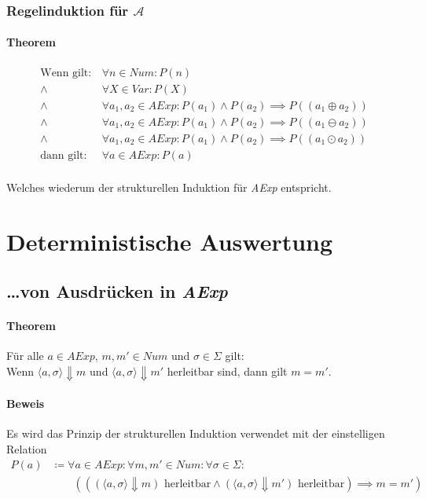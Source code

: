 \documentclass[a4paper, 11pt, accentcolor = tud3b]{tudreport}
\begin{document}
				    \subsubsection{Regelinduktion für $ \mathcal{A} $}
					    \paragraph{Theorem}
						    \begin{align*}
							    \text{Wenn gilt:} & \,\forall n \in \textit{Num} : P(n) \\
							    \land & \,\forall X \in \textit{Var} : P(X) \\
							    \land & \,\forall a _ 1, a _ 2 \in \textit{AExp} : P(a _ 1) \land P(a _ 2) \implies P((a _ 1 \oplus a _ 2)) \\
							    \land & \,\forall a _ 1, a _ 2 \in \textit{AExp} : P(a _ 1) \land P(a _ 2) \implies P((a _ 1 \ominus a _ 2)) \\
							    \land & \,\forall a _ 1, a _ 2 \in \textit{AExp} : P(a _ 1) \land P(a _ 2) \implies P((a _ 1 \odot a _ 2)) \\
							    \text{dann gilt:} & \,\forall a \in \textit{AExp} : P(a) \\
						    \end{align*}
						    
						    Welches wiederum der strukturellen Induktion für \textit{AExp} entspricht.
	    
	    \section{Deterministische Auswertung}
 		    \subsection{\dots von Ausdrücken in \textit{AExp}}
	 		    \paragraph{Theorem}
		 		    Für alle $ a \in \textit{AExp} $, $ m, m' \in \textit{Num} $ und $ \sigma \in \Sigma $ gilt: \\
		 		    Wenn $ \langle a, \sigma \rangle \Downarrow m $ und $ \langle a, \sigma \rangle \Downarrow m' $ herleitbar sind, dann gilt $ m = m' $.
	 		    
	 		    \paragraph{Beweis}
		 		    Es wird das Prinzip der strukturellen Induktion verwendet mit der einstelligen Relation
		 		    \begin{align*}
			 		    P(a) & \coloneqq \forall a \in \textit{AExp} : \forall m, m' \in \textit{Num} : \forall \sigma \in \Sigma : \\
			 		    & \quad\quad (((\langle a, \sigma \rangle \Downarrow m) \text{ herleitbar} \land (\langle a, \sigma \rangle \Downarrow m') \text{ herleitbar}) \implies m = m') \\
		 		    \end{align*}
		 		    
\end{document}
